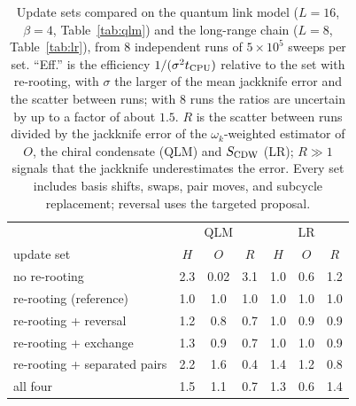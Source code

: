 \begin{table}[t]
\caption{Update sets compared on the quantum link model ($L=16$, $\beta=4$, Table~\ref{tab:qlm}) and the long-range chain ($L=8$, Table~\ref{tab:lr}), from 8 independent runs of $5\times10^5$ sweeps per set. ``Eff.'' is the efficiency $1/(\sigma^2t_{\rm CPU})$ relative to the set with re-rooting, with $\sigma$ the larger of the mean jackknife error and the scatter between runs; with 8 runs the ratios are uncertain by up to a factor of about $1.5$. $R$ is the scatter between runs divided by the jackknife error of the $\omega_k$-weighted estimator of $O$, the chiral condensate (QLM) and $S_{\rm CDW}$ (LR); $R\gg1$ signals that the jackknife underestimates the error. Every set includes basis shifts, swaps, pair moves, and subcycle replacement; reversal uses the targeted proposal.}
\label{tab:updates}
\begin{tabular}{l|ccc|ccc}
\hline\hline
 & \multicolumn{3}{c|}{QLM} & \multicolumn{3}{c}{LR}\\
update set & $H$ & $O$ & $R$ & $H$ & $O$ & $R$\\
\hline
no re-rooting & 2.3 & 0.02 & 3.1 & 1.0 & 0.6 & 1.2 \\
re-rooting (reference) & 1.0 & 1.0 & 1.0 & 1.0 & 1.0 & 1.0 \\
re-rooting + reversal & 1.2 & 0.8 & 0.7 & 1.0 & 0.9 & 0.9 \\
re-rooting + exchange & 1.3 & 0.9 & 0.7 & 1.0 & 1.0 & 0.9 \\
re-rooting + separated pairs & 2.2 & 1.6 & 0.4 & 1.4 & 1.2 & 0.8 \\
all four & 1.5 & 1.1 & 0.7 & 1.3 & 0.6 & 1.4 \\
\hline\hline
\end{tabular}
\end{table}

